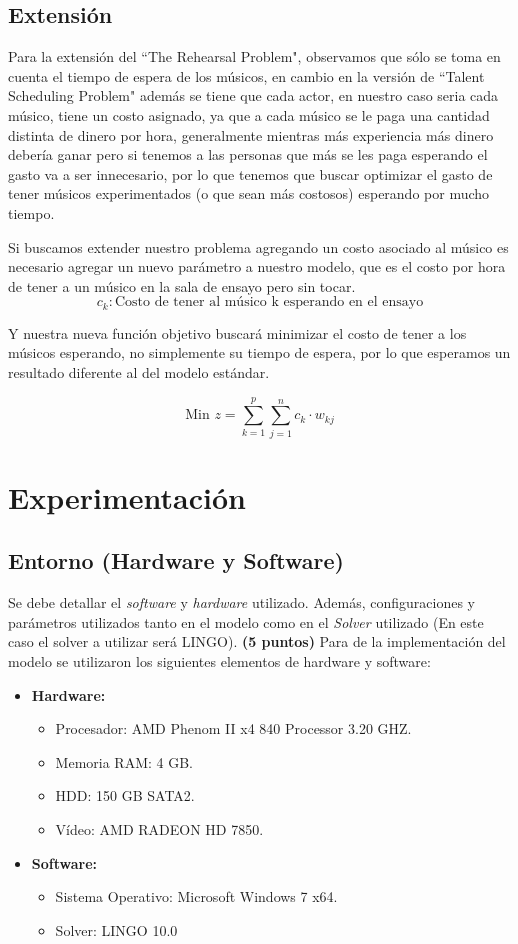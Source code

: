 \documentclass[journal, 10pt]{IEEEtran}
\begin{document}
\subsection{Extensión}
Para la extensión del ``The Rehearsal Problem", observamos que sólo se toma en cuenta el tiempo de espera de los músicos, en cambio en la versión de ``Talent Scheduling Problem" además se tiene que cada actor, en nuestro caso seria cada músico, tiene un costo asignado, ya que a cada músico se le paga una cantidad distinta de dinero por hora, generalmente mientras más experiencia más dinero debería ganar pero si tenemos a las personas que más se les paga esperando el gasto va a ser innecesario, por lo que tenemos que buscar optimizar el gasto de tener músicos experimentados (o que sean más costosos) esperando por mucho tiempo.

Si buscamos extender nuestro problema agregando un costo asociado al músico es necesario agregar un nuevo parámetro a nuestro modelo, que es el costo por hora de tener a un músico en la sala de ensayo pero sin tocar.
	$$c_k : \text{Costo de tener al músico k esperando en el ensayo} $$
	
Y nuestra nueva función objetivo buscará minimizar el costo de tener a los músicos esperando, no simplemente su tiempo de espera, por lo que esperamos un resultado diferente al del modelo estándar.

\begin{equation} \label{eq:FO2}
\text{Min } z = \sum_{k=1}^{p}\sum_{j=1}^n c_{k} \cdot w_{kj} 
\end{equation}

\section{Experimentación}
\subsection{Entorno (Hardware y Software)}
Se debe detallar el \textit{software} y \textit{hardware} utilizado. Además, configuraciones y parámetros utilizados tanto en el modelo como en el \textit{Solver} utilizado (En este caso el solver a utilizar será LINGO). \textbf{(5 puntos)}
Para de la implementación del modelo se utilizaron los siguientes elementos de hardware y software:
\begin{itemize}
	\item \textbf{Hardware:} 
		\begin{itemize}
			\item Procesador: AMD Phenom II x4 840 Processor 3.20 GHZ.
			\item Memoria RAM: 4 GB.
			\item HDD: 150 GB SATA2.	
			\item Vídeo: AMD RADEON HD 7850.
		\end{itemize}
	\item \textbf{Software:}
		\begin{itemize}
			\item Sistema Operativo: Microsoft Windows 7 x64.
			\item Solver: LINGO 10.0
		\end{itemize}
\end{itemize}
\end{document}
